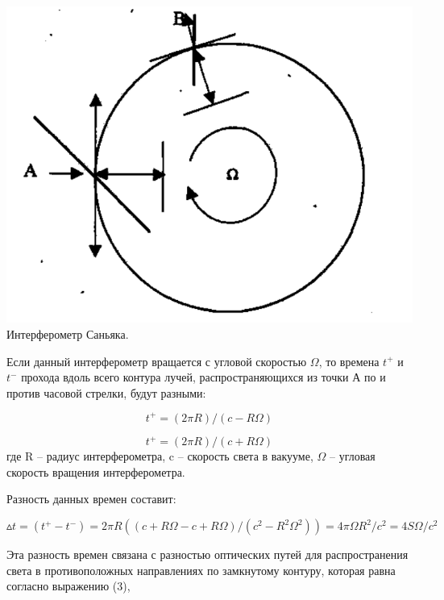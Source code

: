 \documentclass[a4paper,12pt]{article} %
\begin{document}
\begin{center}
    \includegraphics[scale=0.6]{pic1}\\
    \caption{Интерферометр Саньяка.}
    \label{pic1}
\end{center}

Если данный интерферометр вращается с угловой скоростью $\Omega$, то времена $t^+$ и $t^-$ прохода вдоль всего контура лучей, распространяющихся из точки А по и против часовой стрелки, будут разными:

\begin{equation}
    t^+ = (2\pi R ) / (c - R \Omega)
\end{equation}

\begin{equation}
    t^+ = (2\pi R ) / (c + R \Omega)
\end{equation}
где R -- радиус интерферометра, c -- скорость света в вакууме, $\Omega$ -- угловая скорость вращения интерферометра.

Разность данных времен составит:

\begin{equation}
    \vartriangle \!\! t = (t^+ - t^-) = 2 \pi R ((c + R \Omega - c + R \Omega)/
    (c^2 - R^2 \Omega^2)) =
    4 \pi \Omega R^2 / c^2 = 4 S \Omega / c^2
\end{equation}

Эта разность времен связана с разностью оптических
путей для распространения света в противоположных направлениях по замкнутому контуру, которая равна согласно выражению (3),
\end{document}
